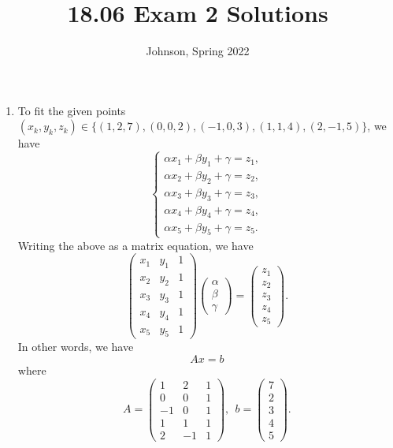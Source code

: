 \documentclass[12pt]{article}
\title{18.06 Exam 2 Solutions}
\date{Johnson, Spring 2022}
\begin{document}
\maketitle

\begin{enumerate}[1.]
    \item To fit the given points $(x_k,y_k,z_k) \in \{(1,2,7),(0,0,2),(-1,0,3),(1,1,4),(2,-1,5)\}$, we have
    \[
    \left\{\begin{array}{c}
    \alpha x_1 + \beta y_1 + \gamma = z_1,\\
    \alpha x_2 + \beta y_2 + \gamma = z_2,\\
    \alpha x_3 + \beta y_3 + \gamma = z_3,\\
    \alpha x_4 + \beta y_4 + \gamma = z_4,\\
    \alpha x_5 + \beta y_5 + \gamma = z_5.
    \end{array}\right.
    \]
    Writing the above as a matrix equation, we have
    \[
    \begin{pmatrix} x_1 & y_1 & 1 \\
    x_2 & y_2 & 1 \\
    x_3 & y_3 & 1 \\
    x_4 & y_4 & 1 \\
    x_5 & y_5 & 1 
    \end{pmatrix} \begin{pmatrix} \alpha \\ \beta \\ \gamma \end{pmatrix} = \begin{pmatrix} z_1 \\ z_2 \\ z_3 \\ z_4 \\ z_5 \end{pmatrix}.
    \]
    In other words, we have
    \[ A x = b\]
    where
    \[
    \boxed{A =  \begin{pmatrix} 1 & 2 & 1 \\
    0 & 0 & 1 \\
    -1 & 0 & 1 \\
    1 & 1 & 1 \\
    2 & -1 & 1 
    \end{pmatrix}}, \ \ \boxed{b = \begin{pmatrix} 7 \\ 2 \\ 3 \\ 4 \\ 5 \end{pmatrix}}.
\]
\end{enumerate}
\end{document}
